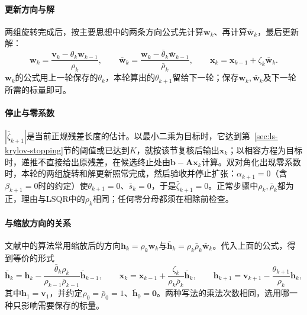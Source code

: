 \paragraph{更新方向与解}
两组旋转完成后，按主要思想中的两条方向公式先计算$\bm w_k$、再计算$\bar{\bm w}_k$，最后更新解：
\[
 \bm w_k=\frac{\bm v_k-\theta_k\bm w_{k-1}}{\rho_k},\qquad
 \bar{\bm w}_k=\frac{\bm w_k-\bar\theta_k\bar{\bm w}_{k-1}}{\bar\rho_k},\qquad
 \bm x_k=\bm x_{k-1}+\zeta_k\bar{\bm w}_k .
\]
$\bm w_k$的公式用上一轮保存的$\theta_k$，本轮算出的$\theta_{k+1}$留给下一轮；保存$\bm w_k,\bar{\bm w}_k$及下一轮所需的标量即可。

\paragraph{停止与零系数}
$|\bar\zeta_{k+1}|$是当前正规残差长度的估计。以最小二乘为目标时，它达到第~\ref{sec:ls-krylov-stopping}节的阈值或已达到$K$，就按该节复核后输出$\bm x_k$；以相容方程为目标时，递推不直接给出原残差，在候选终止处由$\bm b-\bm A\bm x_k$计算。双对角化出现零系数时，本轮的两组旋转和解更新照常完成，然后验收并停止扩张：$\alpha_{k+1}=0$（含$\beta_{k+1}=0$时的约定）使$\theta_{k+1}=0$、$\bar s_k=0$，于是$\bar\zeta_{k+1}=0$。正常步骤中$\rho_k,\bar\rho_k$都为正，理由与LSQR中的$\rho_k$相同；任何零分母都须在相除前检查。

\paragraph{与缩放方向的关系}
文献中的算法常用缩放后的方向$\bm h_k=\rho_k\bm w_k$与$\bar{\bm h}_k=\rho_k\bar\rho_k\bar{\bm w}_k$。代入上面的公式，得到等价的形式
\[
 \bar{\bm h}_k=\bm h_k-\frac{\bar\theta_k\rho_k}{\rho_{k-1}\bar\rho_{k-1}}\bar{\bm h}_{k-1},
 \qquad
 \bm x_k=\bm x_{k-1}+\frac{\zeta_k}{\rho_k\bar\rho_k}\bar{\bm h}_k,\qquad
 \bm h_{k+1}=\bm v_{k+1}-\frac{\theta_{k+1}}{\rho_k}\bm h_k ,
\]
其中$\bm h_1=\bm v_1$，并约定$\rho_0=\bar\rho_0=1$、$\bar{\bm h}_0=\bm0$。两种写法的乘法次数相同，选用哪一种只影响需要保存的标量。

